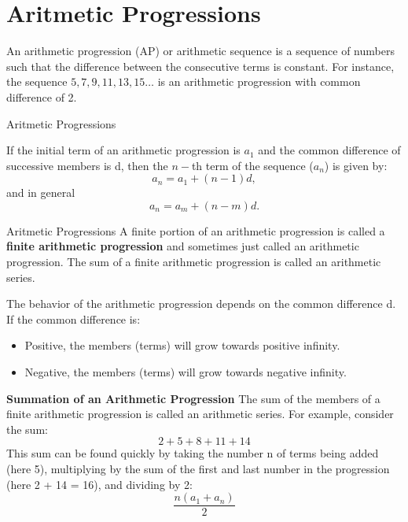 
\section{Aritmetic Progressions}

An arithmetic progression (AP) or arithmetic sequence is a sequence of numbers such that the difference between the consecutive terms is constant. For instance, the sequence $5, 7, 9, 11, 13, 15 \ldots$ is an arithmetic progression with common difference of 2.



{Aritmetic Progressions}



If the initial term of an arithmetic progression is $a_{1}$ and the common difference of successive members is d, then the $n-$th term of the sequence ($a_{n}$) is given by:
\[ a_{n}=a_{1}+(n-1)d, \] 
and in general
\[ a_{n}=a_{m}+(n-m)d.\]



{Aritmetic Progressions}
A finite portion of an arithmetic progression is called a \textbf{finite arithmetic progression} and sometimes just called an arithmetic progression. The sum of a finite arithmetic progression is called an arithmetic series.
\newline


The behavior of the arithmetic progression depends on the common difference d. If the common difference is:
\begin{itemize}
\item Positive, the members (terms) will grow towards positive infinity.
\item Negative, the members (terms) will grow towards negative infinity.
\end{itemize}


\textbf{Summation of an Arithmetic Progression}
The sum of the members of a finite arithmetic progression is called an arithmetic series. For example, consider the sum:
\[2+5+8+11+14\]
This sum can be found quickly by taking the number n of terms being added (here 5), multiplying by the sum of the first and last number in the progression (here 2 + 14 = 16), and dividing by 2:
\[{\frac  {n(a_{1}+a_{n})}{2}}\]

